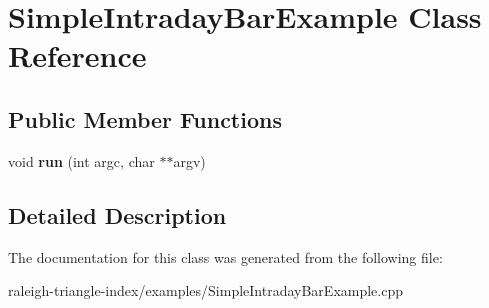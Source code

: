 \section{Simple\+Intraday\+Bar\+Example Class Reference}
\label{class_simple_intraday_bar_example}
\subsection*{Public Member Functions}
\begin{DoxyCompactItemize}
\item 
void {\bfseries run} (int argc, char $\ast$$\ast$argv)\label{class_simple_intraday_bar_example_a945959c100559f102ffea528672777a9}

\end{DoxyCompactItemize}


\subsection{Detailed Description}


The documentation for this class was generated from the following file\+:\begin{DoxyCompactItemize}
\item 
raleigh-\/triangle-\/index/examples/Simple\+Intraday\+Bar\+Example.\+cpp\end{DoxyCompactItemize}
